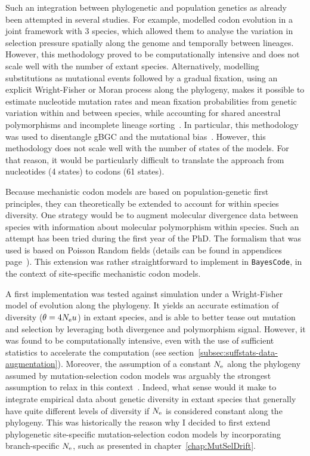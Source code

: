 Such an integration between phylogenetic and population genetics as already been attempted in several studies.
For example, \citet{Wilson2011} modelled codon evolution in a joint framework with $3$ species, which allowed them to analyse the variation in selection pressure spatially along the genome and temporally between lineages.
However, this methodology proved to be computationally intensive and does not scale well with the number of extant species.
Alternatively, modelling substitutions as mutational events followed by a gradual fixation, using an explicit Wright-Fisher or Moran process along the phylogeny, makes it possible to estimate nucleotide mutation rates and mean fixation probabilities from genetic variation within and between species, while accounting for shared ancestral polymorphisms and incomplete lineage sorting~\citep{DeMaio2013, Schrempf2016, Bergman2018, Schrempf2019}.
In particular, this methodology was used to disentangle \acrshort{gBGC} and the mutational bias~\citep{Borges2019, Borges2020}.
However, this methodology does not scale well with the number of states of the models.
For that reason, it would be particularly difficult to translate the approach from nucleotides (4 states) to codons (61 states).

Because mechanistic codon models are based on population-genetic first principles, they can theoretically be extended to account for within species diversity.
One strategy would be to augment molecular divergence data between species with information about molecular polymorphism within species.
Such an attempt has been tried during the first year of the PhD.
The formalism that was used is based on Poisson Random fields (details can be found in appendices page~\pageref{sec-appendix:PRF}).
This extension was rather straightforward to implement in \texttt{BayesCode}, in the context of site-specific mechanistic codon models.

A first implementation was tested against simulation under a Wright-Fisher model of evolution along the phylogeny.
It yields an accurate estimation of diversity ($\theta = 4 N_{\text{e}} u$) in extant species, and is able to better tease out mutation and selection by leveraging both divergence and polymorphism signal.
However, it was found to be computationally intensive, even with the use of sufficient statistics to accelerate the computation (see section~\ref{subsec:suffstats-data-augmentation}).
Moreover, the assumption of a constant $N_{\text{e}}$ along the phylogeny assumed by mutation-selection codon models was arguably the strongest assumption to relax in this context~\citep{Rousselle2018}.
Indeed, what sense would it make to integrate empirical data about genetic diversity in extant species that generally have quite different levels of diversity if $N_{\text{e}}$ is considered constant along the phylogeny.
This was historically the reason why I decided to first extend phylogenetic site-specific mutation-selection codon models by incorporating branch-specific $N_{\text{e}}$, such as presented in chapter~\ref{chap:MutSelDrift}.

